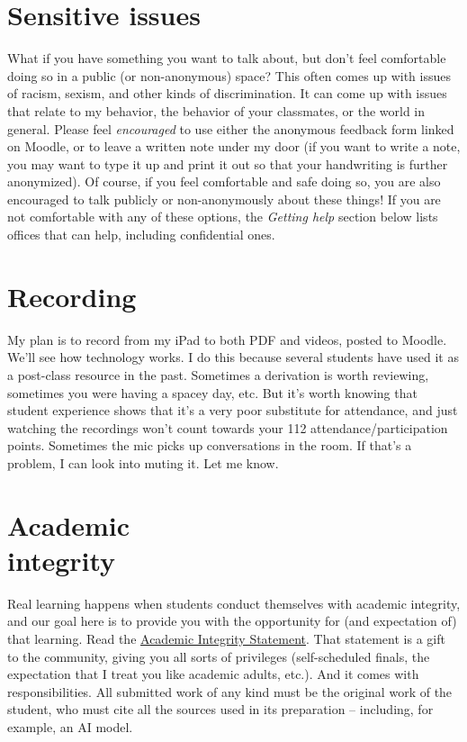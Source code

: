\bigskip

\section{Sensitive issues}
%
What if you have something you want to talk about, but don't feel
comfortable doing so in a public (or non-anonymous) space? This often
comes up with issues of racism, sexism, and other kinds of
discrimination. It can come up with issues that relate to my behavior,
the behavior of your classmates, or the world in general. Please feel
\emph{encouraged} to use either the anonymous feedback form linked on
Moodle, or to leave a written note under my door (if you want to write a
note, you may want to type it up and print it out so that your
handwriting is further anonymized). Of course, if you feel comfortable
and safe doing so, you are also encouraged to talk publicly or
non-anonymously about these things! If you are not comfortable with any
of these options, the \emph{Getting help} section below lists offices
that can help, including confidential ones.

\bigskip

\section{Recording}
%
My plan is to record from my iPad to both PDF and videos, posted to
Moodle. We'll see how technology works. I do this because several
students have used it as a post-class resource in the past. Sometimes a
derivation is worth reviewing, sometimes you were having a spacey day,
etc. But it's worth knowing that student experience shows that it's a
very poor substitute for attendance, and just watching the recordings
won't count towards your 112 attendance/participation points. Sometimes
the mic picks up conversations in the room. If that's a problem, I can
look into muting it. Let me know.

\bigskip

\section{Academic \\ integrity}
%
Real learning happens when students conduct themselves with academic
integrity, and our goal here is to provide you with the opportunity for
(and expectation of) that learning. Read the
\href{https://www.smith.edu/your-campus/offices-services/office-student-affairs/student-handbook/academic-honor-code-0}{Academic
Integrity Statement}. That statement is a gift to the community, giving
you all sorts of privileges (self-scheduled finals, the expectation that
I treat you like academic adults, etc.). And it comes with
responsibilities. All submitted work of any kind must be the original
work of the student, who must cite all the sources used in its
preparation -- including, for example, an AI model.

